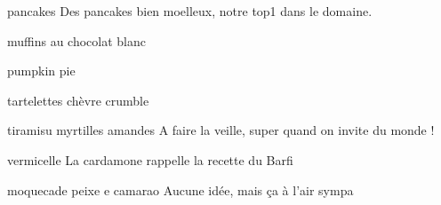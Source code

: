 	\begin{recette}{\heart pancakes}{}
		Des pancakes bien moelleux, notre top1 dans le domaine.
	\end{recette}
	
	\begin{recette}{muffins au chocolat blanc}{}
	\end{recette}
	
	\begin{recette}{pumpkin pie}{}
	\end{recette}
	
	\begin{recette}{tartelettes chèvre crumble}{}
	\end{recette}
	
	\begin{recette}{\heart tiramisu myrtilles amandes}{}
		A faire la veille, super quand on invite du monde !
	\end{recette}
	
	\begin{recette}{vermicelle}{}
		La cardamone rappelle la recette du Barfi
	\end{recette}
	
	\begin{recette}{moquecade peixe e camarao}{}
		Aucune idée, mais ça à l'air sympa
	\end{recette}
	
	
	
